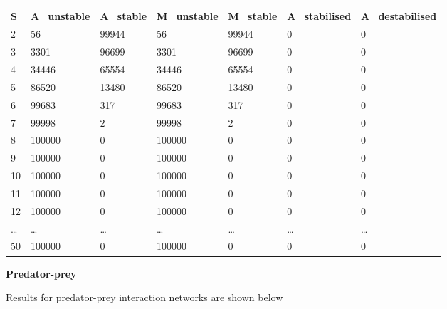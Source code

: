 \documentclass[]{article}
\begin{document}
\begin{longtable}[]{@{}lllllll@{}}
\toprule
S & A\_unstable & A\_stable & M\_unstable & M\_stable & A\_stabilised &
A\_destabilised\tabularnewline
\midrule
\endhead
2 & 56 & 99944 & 56 & 99944 & 0 & 0\tabularnewline
3 & 3301 & 96699 & 3301 & 96699 & 0 & 0\tabularnewline
4 & 34446 & 65554 & 34446 & 65554 & 0 & 0\tabularnewline
5 & 86520 & 13480 & 86520 & 13480 & 0 & 0\tabularnewline
6 & 99683 & 317 & 99683 & 317 & 0 & 0\tabularnewline
7 & 99998 & 2 & 99998 & 2 & 0 & 0\tabularnewline
8 & 100000 & 0 & 100000 & 0 & 0 & 0\tabularnewline
9 & 100000 & 0 & 100000 & 0 & 0 & 0\tabularnewline
10 & 100000 & 0 & 100000 & 0 & 0 & 0\tabularnewline
11 & 100000 & 0 & 100000 & 0 & 0 & 0\tabularnewline
12 & 100000 & 0 & 100000 & 0 & 0 & 0\tabularnewline
\ldots{} & \ldots{} & \ldots{} & \ldots{} & \ldots{} & \ldots{} &
\ldots{}\tabularnewline
50 & 100000 & 0 & 100000 & 0 & 0 & 0\tabularnewline
\bottomrule
\end{longtable}

\textbf{Predator-prey}

Results for predator-prey interaction networks are shown below
\end{document}
